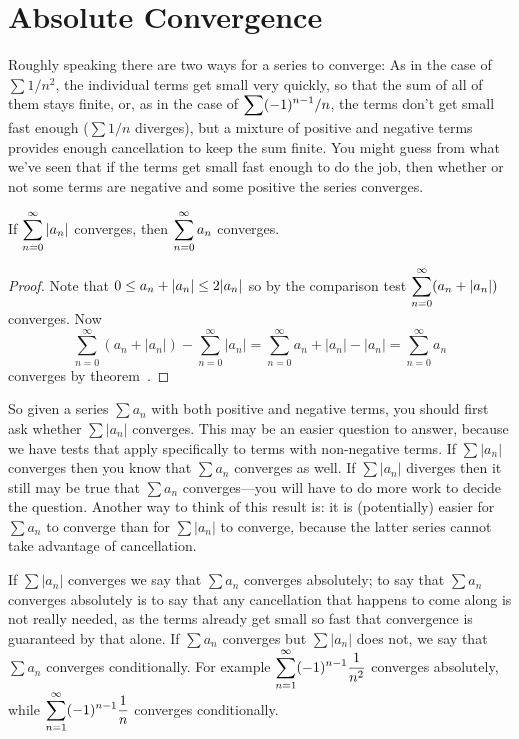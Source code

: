 \chapter{Absolute Convergence}{}{}

\nobreak
Roughly speaking there are two ways for a series to converge: As in
the case of $\sum 1/n^2$, the individual terms get small very quickly,
so that the sum of all of them stays finite, or, as in the case of
$\displaystyle \sum (-1)^{n-1}/n$, the terms don't get small fast enough ($\sum 1/n$
diverges), but a mixture of positive and negative terms provides
enough cancellation to keep the sum finite. You might guess from what
we've seen that if the terms get small fast enough to do the job, then
whether or not some terms are negative and some positive the series
converges. 

\begin{theorem} If $\displaystyle\sum_{n=0}^\infty |a_n|$ converges, then 
$\displaystyle\sum_{n=0}^\infty a_n$ converges.
\end{theorem}
\begin{proof}
Note that $\displaystyle 0\le a_n+|a_n|\le 2|a_n|$ so by the comparison test
$\displaystyle\sum_{n=0}^\infty (a_n+|a_n|)$ converges. Now
$$
  \sum_{n=0}^\infty (a_n+|a_n|) -\sum_{n=0}^\infty |a_n|
  = \sum_{n=0}^\infty a_n+|a_n|-|a_n| = \sum_{n=0}^\infty a_n 
$$
converges by theorem~.
\end{proof}

So given a series $\sum a_n$ with both positive and negative terms,
you should first ask whether $\sum |a_n|$ converges. This may be an
easier question to answer, because we have tests that apply
specifically to terms with non-negative terms. If $\sum |a_n|$
converges then you know that $\sum a_n$ converges as well. If $\sum
|a_n|$ diverges then it still may be true that $\sum a_n$
converges---you will have to do more work to decide the question.
Another way to think of this result is: it is (potentially) easier for
$\sum a_n$ to converge than for $\sum |a_n|$ to converge, because the
latter series cannot take advantage of cancellation. 

If $\sum |a_n|$ converges we say that $\sum a_n$ converges {\dfont
absolutely\/}; to say that $\sum
a_n$ converges absolutely is to say that any cancellation that happens
to come along is not really needed, as the terms already get small so
fast that convergence is guaranteed by that alone. If $\sum a_n$
converges but $\sum |a_n|$ does not, we say that $\sum a_n$ converges
{\dfont conditionally}. For
example $\displaystyle\sum_{n=1}^\infty (-1)^{n-1} {1\over n^2}$ converges
absolutely, while $\displaystyle\sum_{n=1}^\infty (-1)^{n-1} {1\over n}$
converges conditionally.

